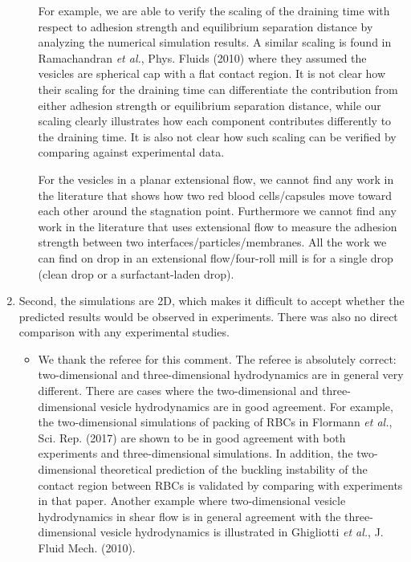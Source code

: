 \documentclass[11pt]{article}
\newcommand{\comment}[1]{{\color{blue} #1}}
\begin{document}
\begin{enumerate}
\begin{itemize}
For example, we are able to verify the scaling of the draining time with respect to adhesion strength and equilibrium separation distance by analyzing the numerical simulation results. 
A similar scaling is found in Ramachandran {\it et al.}, Phys. Fluids (2010) where they assumed the vesicles are spherical cap with a flat contact region. It is not clear how their scaling for the draining time can differentiate the contribution from either adhesion strength or equilibrium separation distance, while our scaling clearly illustrates how each component contributes differently to the draining time. It is also not clear how such scaling can be verified by comparing against experimental data.

For the vesicles in a planar extensional flow, we cannot find any work in the literature that shows how two red blood cells/capsules move toward each other around the stagnation point. Furthermore we cannot find any work in the literature that uses extensional flow to measure the adhesion strength between two interfaces/particles/membranes. All the work we can find on drop in an extensional flow/four-roll mill is for a single drop (clean drop or a surfactant-laden drop).
  
  
\end{itemize}

\noindent
\item\comment{Second, the simulations are 2D, which makes it difficult to accept
whether the predicted results would be observed in experiments. There
was also no direct comparison with any experimental studies.}
\begin{itemize}
  \item We thank the referee for this comment. The referee is absolutely correct: two-dimensional and three-dimensional hydrodynamics are in general very different. There are
  cases where the two-dimensional and three-dimensional  vesicle hydrodynamics are in good agreement. For example, the two-dimensional simulations of packing of RBCs in Flormann {\it et al.}, Sci. Rep. (2017) are shown to be in good agreement with both experiments and three-dimensional simulations. In addition, the two-dimensional theoretical prediction of the buckling instability of the contact region between RBCs is validated by comparing with experiments in that paper.
  Another example where two-dimensional vesicle hydrodynamics in shear flow is in general agreement with the three-dimensional vesicle hydrodynamics is illustrated in Ghigliotti {\it et al.}, J. Fluid Mech. (2010). 
  

\end{itemize}
\end{enumerate}
\end{document}
